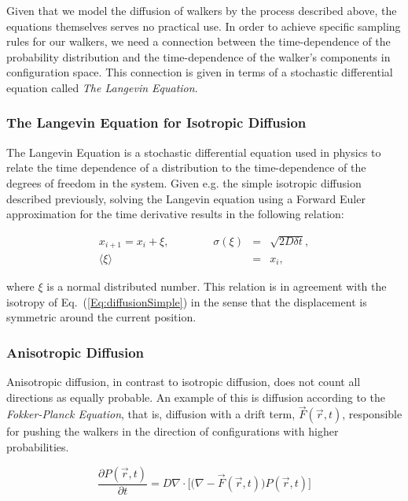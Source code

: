 Given that we model the diffusion of walkers by the process described above, the equations themselves serves no practical use. In order to achieve specific sampling rules for our walkers, we need a connection between the time-dependence of the probability distribution and the time-dependence of the walker's components in configuration space. This connection is given in terms of a stochastic differential equation called \textit{The Langevin Equation}.

\subsubsection{The Langevin Equation for Isotropic Diffusion}

The Langevin Equation is a stochastic differential equation used in physics to relate the time dependence of a distribution to the time-dependence of the degrees of freedom in the system. Given e.g. the simple isotropic diffusion described previously, solving the Langevin equation using a Forward Euler approximation for the time derivative results in the following relation:

\begin{eqnarray}
 x_{i+1} = x_i + \xi, \qquad\qquad \sigma(\xi) &=& \sqrt{2D\delta t}, \\
			     \langle\xi\rangle &=& x_i, \nonumber
\end{eqnarray}

where $\xi$ is a normal distributed number. This relation is in agreement with the isotropy of Eq.~(\ref{Eq:diffusionSimple}) in the sense that the displacement is symmetric around the current position.


\subsubsection{Anisotropic Diffusion}

Anisotropic diffusion, in contrast to isotropic diffusion, does not count all directions as equally probable. An example of this is diffusion according to the \textit{Fokker-Planck Equation}, that is, diffusion with a drift term, $\vec F(\vec r, t)$, responsible for pushing the walkers in the direction of configurations with higher probabilities.

\begin{equation}
 \frac{\partial P(\vec r, t)}{\partial t} = D\nabla\cdot\Big[\Big(\nabla - \vec F(\vec r, t)\Big) P(\vec r, t)\Big] 
 \label{Eq:fokkerPlanck}
\end{equation}

